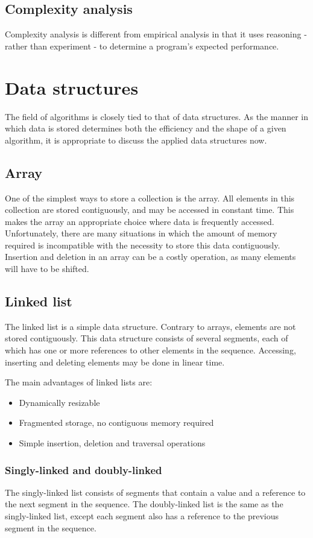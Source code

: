\documentclass{article}
\begin{document}
\subsection{Complexity analysis}
Complexity analysis is different from empirical analysis in that it uses reasoning
- rather than experiment - to determine a program's expected performance.

\newpage

\section{Data structures}
The field of algorithms is closely tied to that of data structures. As the manner in which data is stored determines both the efficiency and the shape of a given algorithm, it is appropriate to discuss the applied data structures now.

\subsection{Array}
One of the simplest ways to store a collection is the array. All elements in this collection are stored contiguously,
and may be accessed in constant time. This makes the array an appropriate choice where data is frequently accessed.
Unfortunately, there are many situations in which the amount of memory required is incompatible with the necessity
to store this data contiguously. Insertion and deletion in an array can be a costly operation, as many elements will have to be shifted.

\subsection{Linked list}
The linked list is a simple data structure. Contrary to arrays, elements are not stored contiguously.
This data structure consists of several segments, each of which has one or more references to other elements in the sequence.
Accessing, inserting and deleting elements may be done in linear time.

The main advantages of linked lists are:
\begin{itemize}
\item Dynamically resizable
\item Fragmented storage, no contiguous memory required
\item Simple insertion, deletion and traversal operations
\end{itemize}

\subsubsection{Singly-linked and doubly-linked}
The singly-linked list consists of segments that contain a value and a reference to the next segment in the sequence.
The doubly-linked list is the same as the singly-linked list, except each segment also has a reference to the previous segment in the sequence.
\end{document}
